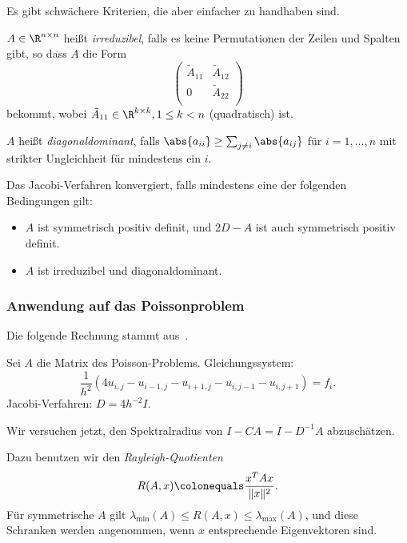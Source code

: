 Es gibt schwächere Kriterien, die aber einfacher zu handhaben sind.

\begin{defi}
$A \in \R^{n \times n}$ heißt \emph{irreduzibel}, falls es keine Permutationen der Zeilen und Spalten gibt,
so dass $A$ die Form
\begin{equation*}
    \begin{pmatrix}
        \tilde{A}_{11} & \tilde{A}_{12} \\
        0 & \tilde{A}_{22} \\
    \end{pmatrix}
\end{equation*}
bekommt, wobei
$\tilde{A}_{11} \in \R^{k \times k},1 \leq k<n$ (quadratisch) ist.

$A$ heißt \emph{diagonaldominant}, falls $\abs{a_{ii}} \geq \sum_{j \neq i} \abs{a_{ij}}$
für $i=1, \ldots, n$ mit strikter Ungleichheit für mindestens ein $i$.
\end{defi}

\begin{satz}
Das Jacobi-Verfahren konvergiert, falls mindestens eine der folgenden Bedingungen gilt:
\begin{itemize}
    \item $A$ ist symmetrisch positiv definit, und $2D-A$ ist auch symmetrisch positiv definit.
    \item $A$ ist irreduzibel und diagonaldominant.
\end{itemize}
\end{satz}

\subsubsection{Anwendung auf das Poissonproblem}

Die folgende Rechnung stammt aus~\citet[Beispiel~13.10]{dahmen_reusken:2008}.

\bigskip

Sei $A$ die Matrix des Poisson-Problems. Gleichungssystem:
\begin{equation*}
    \frac{1}{h^2} \left(4u_{i,j}-u_{i-1,j}-u_{i+1,j}-u_{i,j-1}-u_{i,j+1} \right)=f_i.
\end{equation*}
Jacobi-Verfahren: $D=4h^{-2}I$.

Wir versuchen jetzt, den Spektralradius von $I-CA = I - D^{-1}A$ abzuschätzen.

Dazu benutzen wir den \emph{Rayleigh-Quotienten}
\begin{equation*}
  R(A,x) \colonequals \frac{x^TAx}{\Vert x \Vert^2}.
\end{equation*}
Für symmetrische $A$ gilt $\lambda_\text{min}(A) \le R(A,x) \le \lambda_\text{max}(A)$, und diese Schranken werden
angenommen, wenn $x$ entsprechende Eigenvektoren sind.

